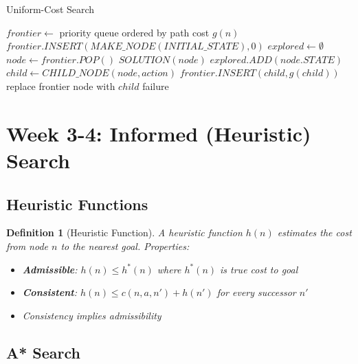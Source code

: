\documentclass[11pt,letterpaper]{article}
\newtheorem{definition}{Definition}[section]
\begin{document}
\begin{algorithm}
\caption{Uniform-Cost Search}
\begin{algorithmic}[1]
    \State $frontier \gets$ priority queue ordered by path cost $g(n)$
    \State $frontier.INSERT(MAKE\_NODE(INITIAL\_STATE), 0)$
    \State $explored \gets \emptyset$
        \State $node \gets frontier.POP()$ 
            \State \Return $SOLUTION(node)$
        \EndIf
        \State $explored.ADD(node.STATE)$
            \State $child \gets CHILD\_NODE(node, action)$
                \State $frontier.INSERT(child, g(child))$
                \State replace frontier node with $child$
            \EndIf
        \EndFor
    \EndWhile
    \State \Return failure
\EndFunction
\end{algorithmic}
\end{algorithm}

\section{Week 3-4: Informed (Heuristic) Search}

\subsection{Heuristic Functions}

\begin{definition}[Heuristic Function]
A heuristic function $h(n)$ estimates the cost from node $n$ to the nearest goal. Properties:
\begin{itemize}
    \item \textbf{Admissible}: $h(n) \leq h^*(n)$ where $h^*(n)$ is true cost to goal
    \item \textbf{Consistent}: $h(n) \leq c(n,a,n') + h(n')$ for every successor $n'$
    \item Consistency implies admissibility
\end{itemize}
\end{definition}

\subsection{A* Search}
\end{document}
